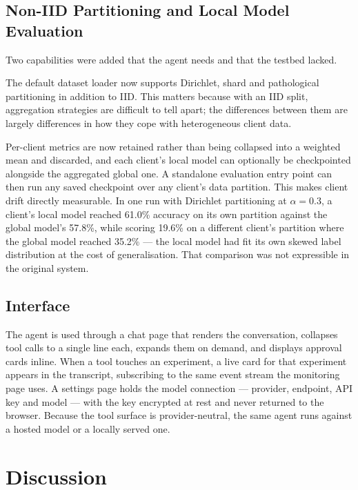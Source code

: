 \documentclass[conference]{IEEEtran}
\begin{document}
\subsection{Non-IID Partitioning and Local Model Evaluation}

Two capabilities were added that the agent needs and that the testbed
lacked.

The default dataset loader now supports Dirichlet, shard and pathological
partitioning in addition to IID.
This matters because with an IID split, aggregation strategies are
difficult to tell apart; the differences between them are largely
differences in how they cope with heterogeneous client data.

Per-client metrics are now retained rather than being collapsed into a
weighted mean and discarded, and each client's local model can optionally
be checkpointed alongside the aggregated global one.
A standalone evaluation entry point can then run any saved checkpoint
over any client's data partition.
This makes client drift directly measurable.
In one run with Dirichlet partitioning at $\alpha = 0.3$, a client's
local model reached 61.0\% accuracy on its own partition against the
global model's 57.8\%, while scoring 19.6\% on a different client's
partition where the global model reached 35.2\% --- the local model had
fit its own skewed label distribution at the cost of generalisation.
That comparison was not expressible in the original system.

\subsection{Interface}

The agent is used through a chat page that renders the conversation,
collapses tool calls to a single line each, expands them on demand, and
displays approval cards inline.
When a tool touches an experiment, a live card for that experiment
appears in the transcript, subscribing to the same event stream the
monitoring page uses.
A settings page holds the model connection --- provider, endpoint, API
key and model --- with the key encrypted at rest and never returned to
the browser.
Because the tool surface is provider-neutral, the same agent runs against
a hosted model or a locally served one.

\section{Discussion}
\label{sec:discussion}
\end{document}
